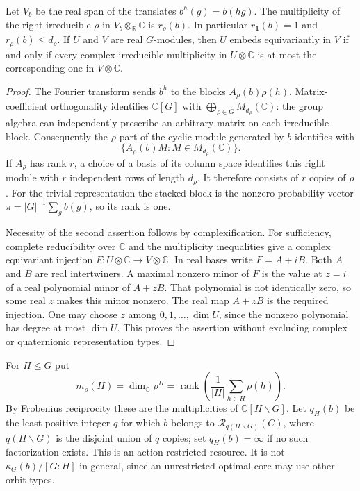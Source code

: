\begin{lemma}
\label{lem:r75-fourier-multiplicity}
Let $V_b$ be the real span of the translates $b^h(g)=b(hg)$. The
multiplicity of the right irreducible $\rho$ in $V_b\otimes_{\mathbb R}
\mathbb C$ is $r_\rho(b)$. In particular $r_{\boldsymbol 1}(b)=1$ and
$r_\rho(b)\le d_\rho$. If $U$ and $V$ are real $G$-modules, then $U$
embeds equivariantly in $V$ if and only if every complex irreducible
multiplicity in $U\otimes\mathbb C$ is at most the corresponding one in
$V\otimes\mathbb C$.
\end{lemma}
\begin{proof}
The Fourier transform sends $b^h$ to the blocks
$A_\rho(b)\rho(h)$. Matrix-coefficient orthogonality identifies
$\mathbb C[G]$ with $\bigoplus_{\rho\in\widehat G}M_{d_\rho}(\mathbb C)$:
the group algebra can independently prescribe an arbitrary matrix on each
irreducible block. Consequently the $\rho$-part of the cyclic module
generated by $b$ identifies with
\[
 \{A_\rho(b)M:M\in M_{d_\rho}(\mathbb C)\}.
\]
If $A_\rho$ has rank $r$, a choice of a basis of its column space
identifies this right module with $r$ independent rows of length
$d_\rho$. It therefore consists of $r$ copies of $\rho$. For the trivial
representation the stacked block is the nonzero probability vector
$\pi=|G|^{-1}\sum_gb(g)$, so its rank is one.

Necessity of the second assertion follows by complexification. For
sufficiency, complete reducibility over $\mathbb C$ and the multiplicity
inequalities give a complex equivariant injection
$F:U\otimes\mathbb C\to V\otimes\mathbb C$. In real bases write
$F=A+iB$. Both $A$ and $B$ are real intertwiners. A maximal nonzero minor
of $F$ is the value at $z=i$ of a real polynomial minor of $A+zB$.
That polynomial is not identically zero, so some real $z$ makes this
minor nonzero. The real map $A+zB$ is the required injection. One may
choose $z$ among $0,1,\ldots,\dim U$, since the nonzero polynomial has
degree at most $\dim U$. This proves the assertion without excluding
complex or quaternionic representation types.
\end{proof}

For $H\le G$ put
\[
 m_\rho(H)=\dim_{\mathbb C}\rho^H
 =\operatorname{rank}\left(\frac1{|H|}\sum_{h\in H}\rho(h)\right).
\]
By Frobenius reciprocity these are the multiplicities of
$\mathbb C[H\backslash G]$. Let $q_H(b)$ be the least positive integer
$q$ for which $b$ belongs to $\mathcal R_{q(H\backslash G)}(C)$, where
$q(H\backslash G)$ is the disjoint union of $q$ copies; set $q_H(b)=\infty$
if no such factorization exists. This is an action-restricted resource.
It is not $\kappa_G(b)/[G:H]$ in general, since an unrestricted optimal
core may use other orbit types.


